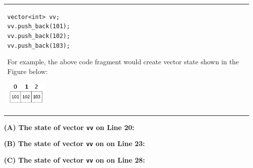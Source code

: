 \documentclass[11pt]{article}
\begin{document}
\begin{tabular}[t]{@{}ll@{}}
\begin{minipage}[t]{0.5\columnwidth}
{\footnotesize
\begin{Verbatim}[frame=single]
vector<int> vv;
vv.push_back(101);
vv.push_back(102);
vv.push_back(103);
\end{Verbatim}
}


For example, the above code fragment would create vector 
state shown in the Figure below:

\includegraphics[width=0.8in]{assignment03-vector-state.png}






\end{minipage}
\end{tabular}

\vspace{10pt}
{\bf (A) The state of vector {\tt vv} on Line 20:}

\vspace{50pt}
{\bf (B) The state of vector {\tt vv} on on Line 23:}

\vspace{50pt}
{\bf (C) The state of vector {\tt vv} on on Line 28:}
\end{document}

